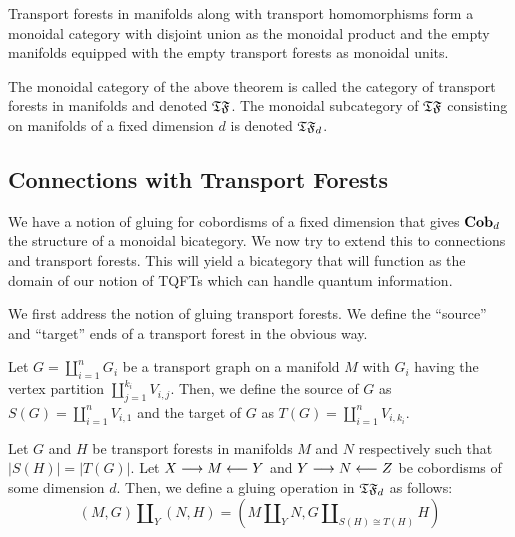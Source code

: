 \documentclass[./Thick_TQFTs_and_Quantum_Information.tex]{subfiles}
\begin{document}
\begin{thm}
Transport forests in manifolds along with transport homomorphisms form a monoidal
category with disjoint union as the monoidal product and the empty manifolds
equipped with the empty transport forests as monoidal units.
\end{thm}

\begin{defn}
The monoidal category of the above theorem is called the category of transport
forests in manifolds and denoted $\mathfrak{TF}$. The monoidal subcategory of $\mathfrak{TF}$
consisting on manifolds of a fixed dimension $d$ is denoted $\mathfrak{TF}_d$.
\end{defn}

\subsection{Connections with Transport Forests}

We have a notion of gluing for cobordisms of a fixed dimension that gives
$\textbf{Cob}_d$ the structure of a monoidal bicategory. We now try to extend this to
connections and transport forests. This will yield a bicategory that will
function as the domain of our notion of TQFTs which can handle quantum
information.

We first address the notion of gluing transport forests. We define the ``source''
and ``target'' ends of a transport forest in the obvious way.
\begin{defn}
Let $G = \coprod_{i = 1}^{n} G_i$ be a transport graph on a manifold $M$ with
$G_i$ having the vertex partition $\coprod_{j = 1}^{k_i} V_{i, j}$. Then, we
define the source of $G$ as $S(G) = \coprod_{i = 1}^{n} V_{i, 1}$ and the target
of $G$ as $T(G) = \coprod_{i = 1}^{n} V_{i, k_i}$.
\end{defn}

\begin{defn}
Let $G$ and $H$ be transport forests in manifolds $M$ and $N$ respectively such
that $|S(H)| = |T(G)|$. Let $X \stackrel{}{\longrightarrow} M \stackrel{}{\longleftarrow} Y$ and $Y \stackrel{}{\longrightarrow} N \stackrel{}{\longleftarrow} Z$ be cobordisms of
some dimension $d$. Then, we define a gluing operation in $\mathfrak{TF}_d$ as follows:
\[
  (M, G) \amalg_Y (N, H) = (M \amalg_Y N, G \amalg_{S(H) \cong T(H)} H)
\]
\end{defn}


\end{document}
